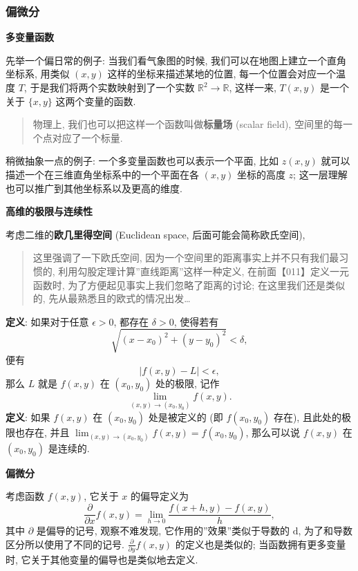 \hypertarget{ux504fux5faeux5206}{%
\subsubsection{偏微分}\label{ux504fux5faeux5206}}

\textbf{多变量函数}

先举一个偏日常的例子: 当我们看气象图的时候,
我们可以在地图上建立一个直角坐标系, 用类似 \((x,y)\)
这样的坐标来描述某地的位置, 每一个位置会对应一个温度 \(T\),
于是我们将两个实数映射到了一个实数
\(\mathbb{R}^2\rightarrow\mathbb{R}\), 这样一来, \(T(x,y)\) 是一个关于
\(\{x,y\}\) 这两个变量的函数.

\begin{quote}
物理上, 我们也可以把这样一个函数叫做\textbf{标量场} (scalar field),
空间里的每一个点对应了一个标量.
\end{quote}

稍微抽象一点的例子: 一个多变量函数也可以表示一个平面, 比如 \(z(x,y)\)
就可以描述一个在三维直角坐标系中的一个平面在各 \((x,y)\) 坐标的高度
\(z\); 这一层理解也可以推广到其他坐标系以及更高的维度.

\textbf{高维的极限与连续性}

考虑二维的\textbf{欧几里得空间} (Euclidean space,
后面可能会简称欧氏空间),

\begin{quote}
这里强调了一下欧氏空间, 因为一个空间里的距离事实上并不只有我们最习惯的,
利用勾股定理计算''直线距离''这样一种定义, 在前面【011】定义一元函数时,
为了方便起见事实上我们忽略了距离的讨论; 在这里我们还是类似的,
先从最熟悉且的欧式的情况出发\ldots{}
\end{quote}

\textbf{定义}: 如果对于任意 \(\epsilon>0\), 都存在 \(\delta>0\),
使得若有 \[
\sqrt{(x-x_0)^2+(y-y_0)^2}<\delta,
\] 便有 \[
|f(x,y)-L|<\epsilon,
\] 那么 \(L\) 就是 \(f(x,y)\) 在 \((x_0,y_0)\) 处的极限, 记作 \[
\lim_{(x,y)\rightarrow(x_0,y_0)}f(x,y).
\] \textbf{定义}: 如果 \(f(x,y)\) 在 \((x_0,y_0)\) 处是被定义的 (即
\(f(x_0,y_0)\) 存在), 且此处的极限也存在, 并且
\(\lim_{(x,y)\rightarrow(x_0,y_0)}f(x,y)=f(x_0,y_0)\), 那么可以说
\(f(x,y)\) 在 \((x_0,y_0)\) 是连续的.

\textbf{偏微分}

考虑函数 \(f(x,y)\), 它关于 \(x\) 的偏导定义为 \[
\frac{\partial}{\partial x}f(x,y)=\lim_{h\rightarrow0}\frac{f(x+h,y)-f(x,y)}{h},
\] 其中 \(\partial\) 是偏导的记号, 观察不难发现,
它作用的''效果''类似于导数的 \(\mathrm{d}\),
为了和导数区分所以使用了不同的记号.
\(\frac{\partial}{\partial y}f(x,y)\) 的定义也是类似的;
当函数拥有更多变量时, 它关于其他变量的偏导也是类似地去定义.

